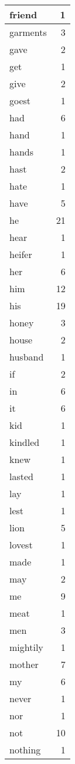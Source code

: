 \begin{center}
\begin{longtable}{l|r}
friend & 1\\ \hline 
garments & 3\\ \hline 
gave & 2\\ \hline 
get & 1\\ \hline 
give & 2\\ \hline 
goest & 1\\ \hline 
had & 6\\ \hline 
hand & 1\\ \hline 
hands & 1\\ \hline 
hast & 2\\ \hline 
hate & 1\\ \hline 
have & 5\\ \hline 
he & 21\\ \hline 
hear & 1\\ \hline 
heifer & 1\\ \hline 
her & 6\\ \hline 
him & 12\\ \hline 
his & 19\\ \hline 
honey & 3\\ \hline 
house & 2\\ \hline 
husband & 1\\ \hline 
if & 2\\ \hline 
in & 6\\ \hline 
it & 6\\ \hline 
kid & 1\\ \hline 
kindled & 1\\ \hline 
knew & 1\\ \hline 
lasted & 1\\ \hline 
lay & 1\\ \hline 
lest & 1\\ \hline 
lion & 5\\ \hline 
lovest & 1\\ \hline 
made & 1\\ \hline 
may & 2\\ \hline 
me & 9\\ \hline 
meat & 1\\ \hline 
men & 3\\ \hline 
mightily & 1\\ \hline 
mother & 7\\ \hline 
my & 6\\ \hline 
never & 1\\ \hline 
nor & 1\\ \hline 
not & 10\\ \hline 
nothing & 1\\ \hline 

\end{longtable}
\end{center}

